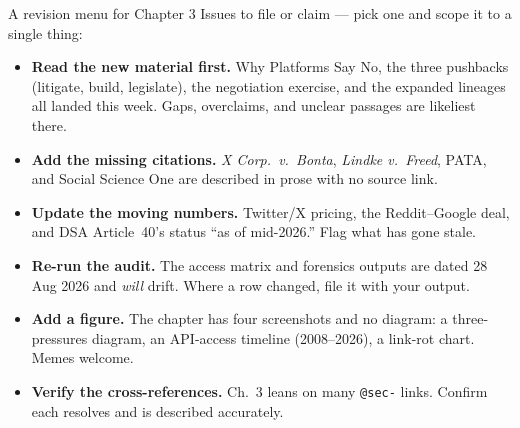 \documentclass[9pt,aspectratio=169]{beamer}
\begin{document}
\begin{frame}{A revision menu for Chapter 3}
    Issues to file or claim --- pick one and scope it to a single thing:
    \begin{itemize}\small
        \item \textbf{Read the new material first.} Why Platforms Say No, the three pushbacks (litigate, build, legislate), the negotiation exercise, and the expanded lineages all landed this week. Gaps, overclaims, and unclear passages are likeliest there.
        \item \textbf{Add the missing citations.} \emph{X Corp.\ v.\ Bonta}, \emph{Lindke v.\ Freed}, PATA, and Social Science One are described in prose with no source link.
        \item \textbf{Update the moving numbers.} Twitter/X pricing, the Reddit--Google deal, and DSA Article~40's status ``as of mid-2026.'' Flag what has gone stale.
        \item \textbf{Re-run the audit.} The access matrix and forensics outputs are dated 28 Aug 2026 and \textit{will} drift. Where a row changed, file it with your output.
        \item \textbf{Add a figure.} The chapter has four screenshots and no diagram: a three-pressures diagram, an API-access timeline (2008--2026), a link-rot chart. Memes welcome.
        \item \textbf{Verify the cross-references.} Ch.~3 leans on many \texttt{@sec-} links. Confirm each resolves and is described accurately.
    \end{itemize}
\end{frame}
\end{document}
